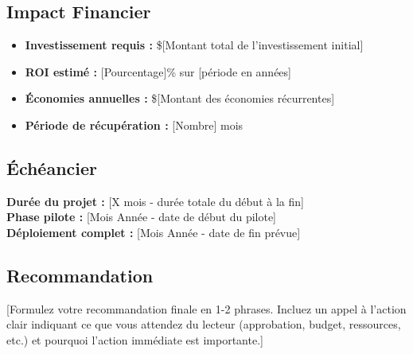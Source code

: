 \begin{center}
{\begin{minipage}{0.95\textwidth}
\subsection*{\color{DollaramaGreen}Impact Financier}
\begin{itemize}[leftmargin=1em]
    \item \textbf{Investissement requis :} \$[Montant total de l'investissement initial]
    \item \textbf{ROI estimé :} [Pourcentage]\% sur [période en années]
    \item \textbf{Économies annuelles :} \$[Montant des économies récurrentes]
    \item \textbf{Période de récupération :} [Nombre] mois
\end{itemize}

\subsection*{\color{DollaramaGreen}Échéancier}
\textbf{Durée du projet :} [X mois - durée totale du début à la fin] \\
\textbf{Phase pilote :} [Mois Année - date de début du pilote] \\
\textbf{Déploiement complet :} [Mois Année - date de fin prévue]

\subsection*{\color{DollaramaGreen}Recommandation}
[Formulez votre recommandation finale en 1-2 phrases. Incluez un appel à l'action clair indiquant ce que vous attendez du lecteur (approbation, budget, ressources, etc.) et pourquoi l'action immédiate est importante.]

\vspace{0.5em}
\end{minipage}
}
\end{center}